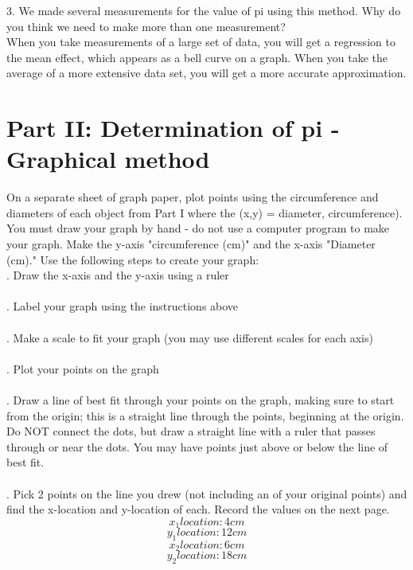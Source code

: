 \documentclass[12pt]{article}
\begin{document}
3. \hspace{2mm} We made several measurements for the value of pi using this method. Why do you think we need to make more than one measurement?
\\ \indent When you take measurements of a large set of data, you will get a regression to the mean effect, which appears as a bell curve on a graph. When you take the average of a more extensive data set, you will get a more accurate approximation. 

\pagebreak

\section{Part II: Determination of pi - Graphical method}

\hspace{4mm}On a separate sheet of graph paper, plot points using the circumference and diameters of each object from Part I where the (x,y) = diameter, circumference). You must draw your graph by hand - do not use a computer program to make your graph. Make the y-axis "circumference (cm)" and the x-axis "Diameter (cm)." Use the following steps to create your graph: \\

. Draw the x-axis and the y-axis using a ruler \\
\\ . Label your graph using the instructions above \\
\\ . Make a scale to fit your graph (you may use different scales for each axis) \\
\\ . Plot your points on the graph \\
\\ . Draw a line of best fit through your points on the graph, making sure to start from the origin; this is a straight line through the points, beginning at the origin. Do NOT connect the dots, but draw a straight line with a ruler that passes through or near the dots. You may have points just above or below the line of best fit. \\
\\ . Pick 2 points on the line you drew (not including an of your original points) and find the x-location and y-location of each. Record the values on the next page. \\
$$x_1 location: 4cm$$
$$y_1 location:12cm$$
$$x_2 location: 6cm$$
$$y_2 location: 18cm$$
\end{document}
